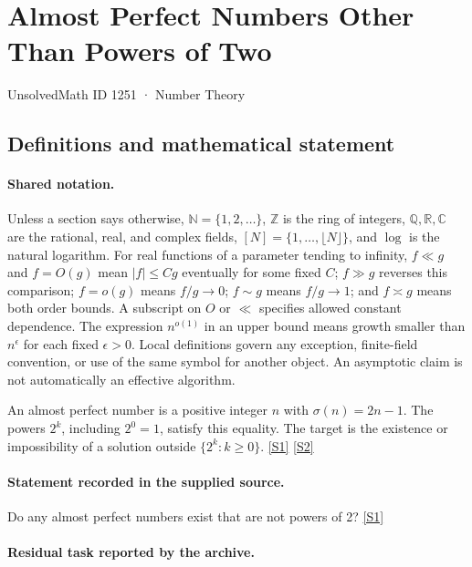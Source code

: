 \documentclass[11pt,a4paper]{article}
\newcommand{\N}{\mathbb{N}}
\newcommand{\Z}{\mathbb{Z}}
\newcommand{\Q}{\mathbb{Q}}
\newcommand{\R}{\mathbb{R}}
\newcommand{\C}{\mathbb{C}}
\newcommand{\sref}[2]{\hyperlink{source:#1:#2}{[S#2]}}
\begin{document}

\setcounter{section}{1250}

\section{Almost Perfect Numbers Other Than Powers of Two}\label{1251}

{\small\sffamily UnsolvedMath ID 1251 · Number Theory}

\subsection{Definitions and mathematical statement}

\paragraph{Shared notation.}Unless a section says otherwise, $\N=\{1,2,\ldots\}$,
$\Z$ is the ring of integers, $\Q,\R,\C$ are the rational, real, and complex
fields, $[N]=\{1,\ldots,\lfloor N\rfloor\}$, and $\log$ is the natural
logarithm. For real functions of a parameter tending to infinity,
$f\ll g$ and $f=O(g)$ mean $|f|\leq Cg$ eventually for some fixed $C$;
$f\gg g$ reverses this comparison; $f=o(g)$ means $f/g\to0$;
$f\sim g$ means $f/g\to1$; and $f\asymp g$ means both order bounds.
A subscript on $O$ or $\ll$ specifies allowed constant dependence.
The expression $n^{o(1)}$ in an upper bound means growth smaller than
$n^\epsilon$ for each fixed $\epsilon>0$. Local definitions govern any
exception, finite-field convention, or use of the same symbol for another
object. An asymptotic claim is not automatically an effective algorithm.



An almost perfect number is a positive integer $n$ with $\sigma(n)=2n-1$. The powers $2^k$, including $2^0=1$, satisfy this equality. The target is the existence or impossibility of a solution outside $\{2^k:k\geq0\}$. \sref{1251}{1} \sref{1251}{2}

\paragraph{Statement recorded in the supplied source.}
Do any almost perfect numbers exist that are not powers of 2? \sref{1251}{1}

\paragraph{Residual task reported by the archive.}
\end{document}
